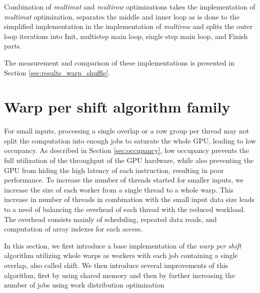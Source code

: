 Combination of \textit{multimat} and \textit{multirow} optimizations takes the implementation of \textit{multimat} optimization, separates the middle and inner loop as is done to the simplified implementation in the implementation of \textit{multirow} and splits the outer loop iterations into Init, multistep main loop, single step main loop, and Finish parts.

The measurement and comparison of these implementations is presented in Section \ref{sec:results_warp_shuffle}.

\section{Warp per shift algorithm family}
\label{sec:occupancy_improvements}


For small inputs, processing a single overlap or a row group per thread may not split the computation into enough jobs to saturate the whole GPU, leading to low occupancy. As described in Section \ref{sec:occupancy}, low occupancy prevents the full utilization of the throughput of the GPU hardware, while also preventing the GPU from hiding the high latency of each instruction, resulting in poor performance. To increase the number of threads started for smaller inputs, we increase the size of each worker from a single thread to a whole warp. This increase in number of threads in combination with the small input data size leads to a need of balancing the overhead of each thread with the reduced workload. The overhead consists mainly of scheduling, repeated data reads, and computation of array indexes for each access. 


In this section, we first introduce a base implementation of the \textit{warp per shift} algorithm utilizing whole warps as workers with each job containing a single overlap, also called shift. We then introduce several improvements of this algorithm, first by using shared memory and then by further increasing the number of jobs using work distribution optimization

